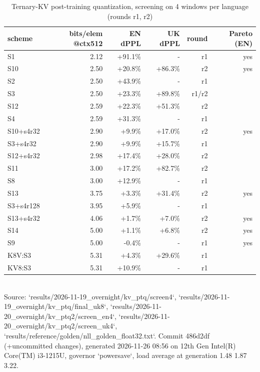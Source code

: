 \begin{table}[t]\centering\small
\caption{Ternary-KV post-training quantization, screening on 4 windows per language (rounds r1, r2)}
\begin{tabular}{lrrrrr}\toprule
scheme & bits/elem @ctx512 & EN dPPL & UK dPPL & round & Pareto (EN) \\ \midrule
S1 & 2.12 & +91.1\% & - & r1 & yes \\
S10 & 2.50 & +20.8\% & +86.3\% & r2 & yes \\
S2 & 2.50 & +43.9\% & - & r1 &  \\
S3 & 2.50 & +23.3\% & +89.8\% & r1/r2 &  \\
S12 & 2.59 & +22.3\% & +51.3\% & r2 &  \\
S4 & 2.59 & +31.3\% & - & r1 &  \\
S10+s4r32 & 2.90 & +9.9\% & +17.0\% & r2 & yes \\
S3+s4r32 & 2.90 & +9.9\% & +15.7\% & r1 &  \\
S12+s4r32 & 2.98 & +17.4\% & +28.0\% & r2 &  \\
S11 & 3.00 & +17.2\% & +82.7\% & r2 &  \\
S8 & 3.00 & +12.9\% & - & r1 &  \\
S13 & 3.75 & +3.3\% & +31.4\% & r2 & yes \\
S3+s4r128 & 3.95 & +5.9\% & - & r1 &  \\
S13+s4r32 & 4.06 & +1.7\% & +7.0\% & r2 & yes \\
S14 & 5.00 & +1.1\% & +6.8\% & r2 & yes \\
S9 & 5.00 & -0.4\% & - & r1 & yes \\
K8V:S3 & 5.31 & +4.3\% & +29.6\% & r1 &  \\
KV8:S3 & 5.31 & +10.9\% & - & r1 &  \\
\bottomrule\end{tabular}
\\[2pt]{\scriptsize Source: `results/2026-11-19\_overnight/kv\_ptq/screen4`, `results/2026-11-19\_overnight/kv\_ptq/final\_uk8`, `results/2026-11-20\_overnight/kv\_ptq2/screen\_en4`, `results/2026-11-20\_overnight/kv\_ptq2/screen\_uk4`, `results/reference/golden/nll\_golden\_float32.txt`. Commit 486d2df (+uncommitted changes), generated 2026-11-26 08:56 on 12th Gen Intel(R) Core(TM) i3-1215U, governor `powersave`, load average at generation 1.48 1.87 3.22.}
\end{table}

